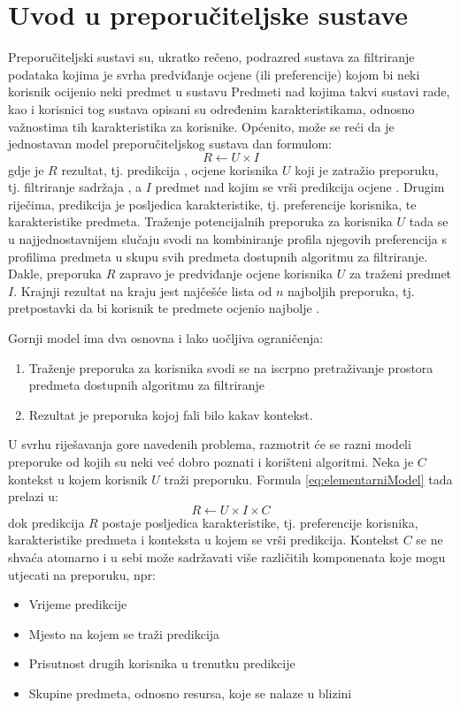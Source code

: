 \documentclass[times, utf8, diplomski, numeric]{fer}
\begin{document}
\section{Uvod u preporučiteljske sustave}
Preporučiteljski sustavi su, ukratko rečeno, podrazred sustava za filtriranje
podataka kojima je svrha predviđanje ocjene (ili preferencije) kojom bi neki
korisnik ocijenio neki predmet u sustavu \cite{RSHandbook} Predmeti nad kojima
takvi sustavi rade, kao i korisnici tog sustava opisani su određenim
karakteristikama, odnosno važnostima tih karakteristika za korisnike. Općenito,
može se reći da je jednostavan model preporučiteljskog sustava dan formulom:
\begin{equation}
\label{eq:elementarniModel}
	R \leftarrow U \times I
\end{equation}
gdje je $R$ rezultat, tj. predikcija ,
ocjene korisnika $U$  koji je zatražio preporuku, tj. filtriranje
sadržaja , a $I$ predmet nad kojim se vrši predikcija ocjene .
Drugim riječima, predikcija je posljedica karakteristike, tj. preferencije
korisnika, te karakteristike predmeta. Traženje potencijalnih preporuka za
korisnika $U$ tada se u najjednostavnijem slučaju svodi na kombiniranje profila
njegovih preferencija s profilima predmeta u skupu svih predmeta dostupnih
algoritmu za filtriranje.
Dakle, preporuka $R$ zapravo je predviđanje ocjene korisnika $U$ za
traženi predmet $I$. Krajnji rezultat na kraju jest najčešće lista od $n$
najboljih preporuka, tj. pretpostavki da bi korisnik te predmete ocjenio
najbolje . 

Gornji model ima dva osnovna i lako uočljiva ograničenja:
\begin{enumerate}
  \item Traženje preporuka za korisnika svodi se na iscrpno pretraživanje
  prostora predmeta dostupnih algoritmu za filtriranje
  \item Rezultat je preporuka kojoj fali bilo kakav kontekst.
\end{enumerate}

U svrhu riješavanja gore navedenih problema, razmotrit će se razni modeli
preporuke od kojih su neki već dobro poznati i korišteni algoritmi. Neka je $C$
kontekst u kojem korisnik $U$ traži preporuku. Formula \ref{eq:elementarniModel}
tada prelazi u:
\begin{equation}
\label{eq:elementarniModelSKontekstom}
	R \leftarrow U \times I \times C
\end{equation}
dok predikcija $R$ postaje posljedica karakteristike, tj. preferencije
korisnika, karakteristike predmeta i konteksta u kojem se vrši predikcija.
Kontekst $C$ se ne shvaća atomarno i u sebi može sadržavati više različitih
komponenata koje mogu utjecati na preporuku, npr:
\begin{itemize}
  \item Vrijeme predikcije
  \item Mjesto na kojem se traži predikcija
  \item Prisutnost drugih korisnika u trenutku predikcije
  \item Skupine predmeta, odnosno resursa, koje se nalaze u blizini
\end{itemize}
\end{document}
